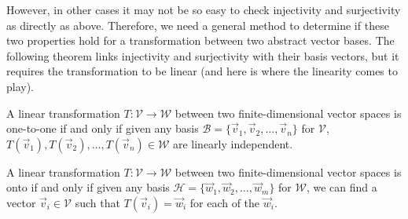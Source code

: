 However, in other cases it may not be so easy to check injectivity and surjectivity as directly as above. Therefore, we need a general method to determine if these two properties hold for a transformation between two abstract vector bases. The following theorem links injectivity and surjectivity with their basis vectors, but it requires the transformation to be linear (and here is where the linearity comes to play).

\begin{thm}
\label{thm:oneto_onebasis}
A linear transformation $T: \mathcal{V} \to \mathcal{W}$ between two finite-dimensional vector spaces is one-to-one if and only if given any basis $\mathcal{B} = \{\vec{v}_1, \vec{v}_2, \ldots, \vec{v}_n\}$ for $\mathcal{V}$, $T(\vec{v}_1), T(\vec{v}_2), \ldots, T(\vec{v}_n) \in \mathcal{W}$ are linearly independent.
\end{thm}
\begin{thm}
\label{thm:onto_basis}
A linear transformation $T: \mathcal{V} \to \mathcal{W}$ between two finite-dimensional vector spaces is onto if and only if given any basis $\mathcal{H} = \{\vec{w}_1, \vec{w}_2, \ldots, \vec{w}_m\}$ for $\mathcal{W}$, we can find a vector $\vec{v}_i \in \mathcal{V}$ such that $T(\vec{v}_i) = \vec{w}_i$ for each of the $\vec{w}_i$.
\end{thm}
